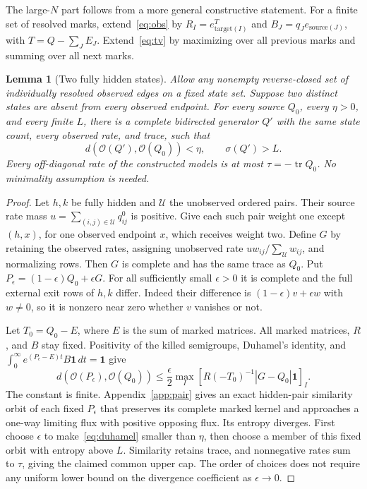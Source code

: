 \documentclass[aps,pre,onecolumn,11pt,longbibliography,notitlepage]{revtex4-2}
\newtheorem{lemma}[theorem]{Lemma}
\newcommand{\1}{\mathbf 1}
\newcommand{\Obs}{\mathcal O}
\newcommand{\tr}{\operatorname{tr}}
\newcommand{\sig}{\sigma}
\begin{document}
The large-$N$ part follows from a more general constructive statement. For a finite set of resolved marks, extend~\eqref{eq:obs} by $R_I=e_{\mathrm{target}(I)}^T$ and $B_J=q_J e_{\mathrm{source}(J)}$, with $T=Q-\sum_J E_J$. Extend~\eqref{eq:tv} by maximizing over all previous marks and summing over all next marks.
\begin{lemma}[Two fully hidden states]\label{lem:neighborhood}
Allow any nonempty reverse-closed set of individually resolved observed edges on a fixed state set. Suppose two distinct states are absent from every observed endpoint. For every source $Q_0$, every $\eta>0$, and every finite $L$, there is a complete bidirected generator $Q'$ with the same state count, every observed rate, and trace, such that
\begin{equation}
 d(\Obs(Q'),\Obs(Q_0))<\eta,\qquad\sig(Q')>L.
\end{equation}
Every off-diagonal rate of the constructed models is at most $\tau=-\tr Q_0$. No minimality assumption is needed.
\end{lemma}

\begin{proof}
Let $h,k$ be fully hidden and $\mathcal U$ the unobserved ordered pairs. Their source rate mass $u=\sum_{(i,j)\in\mathcal U}q^0_{ij}$ is positive. Give each such pair weight one except $(h,x)$, for one observed endpoint $x$, which receives weight two. Define $G$ by retaining the observed rates, assigning unobserved rate $u w_{ij}/\sum_{\mathcal U}w_{ij}$, and normalizing rows. Then $G$ is complete and has the same trace as $Q_0$. Put $P_\epsilon=(1-\epsilon)Q_0+\epsilon G$. For all sufficiently small $\epsilon>0$ it is complete and the full external exit rows of $h,k$ differ. Indeed their difference is $(1-\epsilon)v+\epsilon w$ with $w\ne0$, so it is nonzero near zero whether $v$ vanishes or not.

Let $T_0=Q_0-E$, where $E$ is the sum of marked matrices. All marked matrices, $R$, and $B$ stay fixed. Positivity of the killed semigroups, Duhamel's identity, and $\int_0^\infty e^{(P_\epsilon-E)t}B\1\,dt=\1$ give
\begin{equation}
 d(\Obs(P_\epsilon),\Obs(Q_0))
 \le\frac\epsilon2\max_I[R(-T_0)^{-1}|G-Q_0|\1]_I.\label{eq:duhamel}
\end{equation}
The constant is finite. Appendix~\ref{app:pair} gives an exact hidden-pair similarity orbit of each fixed $P_\epsilon$ that preserves its complete marked kernel and approaches a one-way limiting flux with positive opposing flux. Its entropy diverges. First choose $\epsilon$ to make~\eqref{eq:duhamel} smaller than $\eta$, then choose a member of this fixed orbit with entropy above $L$. Similarity retains trace, and nonnegative rates sum to $\tau$, giving the claimed common upper cap. The order of choices does not require any uniform lower bound on the divergence coefficient as $\epsilon\to0$.
\end{proof}
\end{document}
